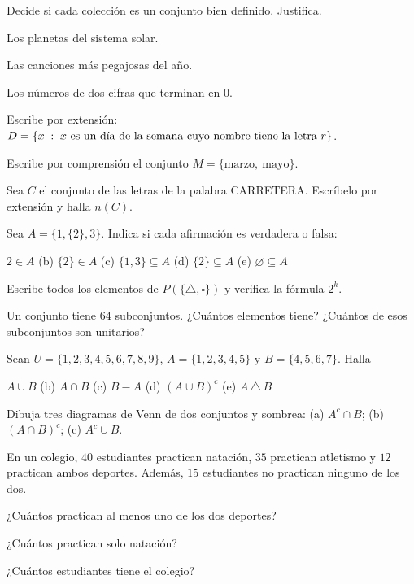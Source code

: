 \documentclass[11pt,a4paper]{article}
\begin{document}
\begin{ejercicios}
\item Decide si cada colección es un conjunto bien definido. Justifica.
  \begin{ejercicios}
  \item Los planetas del sistema solar.
  \item Las canciones más pegajosas del año.
  \item Los números de dos cifras que terminan en 0.
  \end{ejercicios}
\item Escribe por extensión: $D=\{x\;:\; x\text{ es un día de la semana cuyo nombre tiene la letra }r\}$.
\item Escribe por comprensión el conjunto $M=\{\text{marzo},\ \text{mayo}\}$.
\item Sea $C$ el conjunto de las letras de la palabra CARRETERA. Escríbelo por extensión y halla $n(C)$.
\item Sea $A=\{1,\{2\},3\}$. Indica si cada afirmación es verdadera o falsa:
  \begin{ejercicios}
  \item $2\in A$ \quad (b) $\{2\}\in A$ \quad (c) $\{1,3\}\subseteq A$ \quad (d) $\{2\}\subseteq A$ \quad (e) $\varnothing\subseteq A$
  \end{ejercicios}
\item Escribe todos los elementos de $P(\{\triangle,\square\})$ y verifica la fórmula $2^{k}$.
\item Un conjunto tiene $64$ subconjuntos. ¿Cuántos elementos tiene? ¿Cuántos de esos subconjuntos son unitarios?
\item Sean $U=\{1,2,3,4,5,6,7,8,9\}$, $A=\{1,2,3,4,5\}$ y $B=\{4,5,6,7\}$. Halla
  \begin{ejercicios}
  \item $A\cup B$ \quad (b) $A\cap B$ \quad (c) $B-A$ \quad (d) $(A\cup B)^{c}$ \quad (e) $A\,\triangle\,B$
  \end{ejercicios}
\item Dibuja tres diagramas de Venn de dos conjuntos y sombrea: (a) $A^{c}\cap B$; (b) $(A\cap B)^{c}$; (c) $A^{c}\cup B$.
\item En un colegio, $40$ estudiantes practican natación, $35$ practican atletismo y $12$ practican ambos deportes.
  Además, $15$ estudiantes no practican ninguno de los dos.
  \begin{ejercicios}
  \item ¿Cuántos practican al menos uno de los dos deportes?
  \item ¿Cuántos practican solo natación?
  \item ¿Cuántos estudiantes tiene el colegio?
  \end{ejercicios}
\end{ejercicios}
\end{document}
